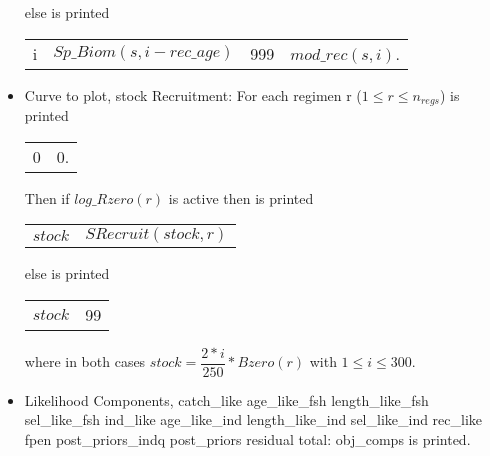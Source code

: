 \documentclass{article}
\begin{document}
\begin{itemize}
    else 
    is printed
    \begin{center}
        \begin{tabular}{c c c c}
            i &  $Sp\_Biom(s,i-rec\_age)$ & 999 & $mod\_rec(s,i)$.\\
        \end{tabular}
    \end{center}
    \item Curve to plot, stock Recruitment:  For each regimen r ($1\leq r \leq n_{regs}$) is printed
\begin{center}
    \begin{tabular}{c c}
        0 & 0. \end{tabular}
\end{center}
Then if $log\_Rzero(r)$ is active then is printed
\begin{center}
    \begin{tabular}{c c}
        $stock$ &  $SRecruit(stock, r)$ \end{tabular}
\end{center}
else is printed

\begin{center}
    \begin{tabular}{c c}
        $stock$ &  99 \\

    \end{tabular}
\end{center}
where in both cases $stock=\dfrac{2*i}{250}*Bzero(r)$ with $1\leq i \leq 300$.
    \item Likelihood Components, catch\_like age\_like\_fsh length\_like\_fsh sel\_like\_fsh ind\_like age\_like\_ind length\_like\_ind sel\_like\_ind rec\_like fpen post\_priors\_indq post\_priors residual total: obj\_comps is printed.
    

\end{itemize}
\end{document}
